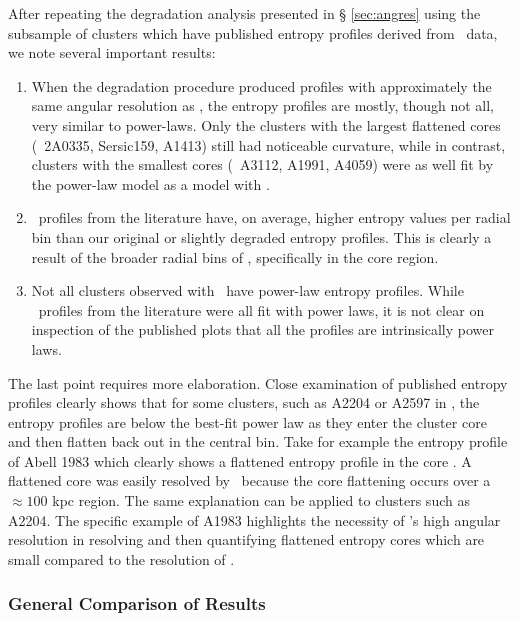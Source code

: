 \documentclass[12pt,preprint]{aastex}
\begin{document}
After repeating the degradation analysis presented in \S
\ref{sec:angres} using the subsample of clusters which have published
entropy profiles derived from \xmm\ data, we note several important
results:
\begin{enumerate}
\item When the degradation procedure produced profiles with
  approximately the same angular resolution as \xmm, the entropy
  profiles are mostly, though not all, very similar to
  power-laws. Only the clusters with the largest flattened cores
  (\eg\ 2A0335, Sersic159, A1413) still had noticeable curvature,
  while in contrast, clusters with the smallest cores (\eg\ A3112,
  A1991, A4059) were as well fit by the power-law model as a model
  with \kna.
\item \xmm\ profiles from the literature have, on average, higher
  entropy values per radial bin than our original or slightly degraded
  entropy profiles. This is clearly a result of the broader radial
  bins of \xmm, specifically in the core region.
\item Not all clusters observed with \xmm\ have power-law entropy
  profiles. While \xmm\ profiles from the literature were all fit with
  power laws, it is not clear on inspection of the published plots
  that all the profiles are intrinsically power laws.
\end{enumerate}
The last point requires more elaboration. Close examination of
published entropy profiles clearly shows that for some clusters, such
as A2204 or A2597 in \citet{pratt06}, the entropy profiles are below
the best-fit power law as they enter the cluster core and then flatten
back out in the central bin. Take for example the entropy profile of
Abell 1983 which clearly shows a flattened entropy profile in the core
\citep{2003A&A...408....1P}. A flattened core was easily resolved by
\xmm\ because the core flattening occurs over a $\approx 100$ kpc
region. The same explanation can be applied to clusters such as
A2204. The specific example of A1983 highlights the necessity of
\chandra's high angular resolution in resolving and then quantifying
flattened entropy cores which are small compared to the resolution of
\xmm.

\subsubsection{General Comparison of Results}
\end{document}
